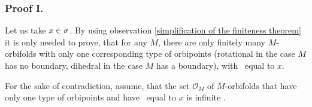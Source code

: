
\subsubsection{Proof I.} 

Let us take $x\in {\sigma}$. 
By using observation \ref{simplification of the finiteness theorem} it is only needed to prove, 
that for any $M$, there are only finitely many $M$-orbifolds with only one 
corresponding type of orbipoints 
(rotational in the case $M$ has no boundary, dihedral in the case $M$ has a boundary), 
with \Eoc\ equal to $x$. 




For the sake of contradiction, assume, that the set $\mathcal{O}_M$
of $M$-orbifolds that have only one type of orbipoints and have \Eoc\ equal to $x$ is infinite 
.



